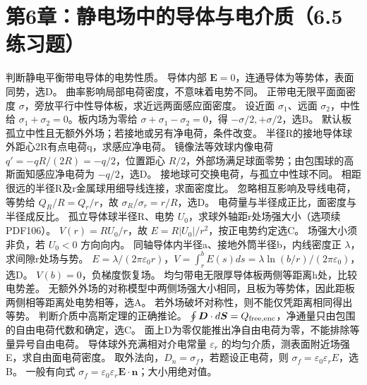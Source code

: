 \section{第6章：静电场中的导体与电介质（6.5练习题）}
\problemtext 判断静电平衡带电导体的电势性质。
\workings 导体内部 $\bm E=0$，连通导体为等势体，表面同势，选D。
\crosscheck 曲率影响局部电荷密度，不意味着电势不同。
\problemtext 正带电无限平面面密度 $\sigma$，旁放平行中性导体板，求近远两面感应面密度。
\workings 设近面 $\sigma_1$、远面 $\sigma_2$，中性给 $\sigma_1+\sigma_2=0$。板内场为零给 $\sigma+\sigma_1-\sigma_2=0$，得 $-\sigma/2,+\sigma/2$，选B。
\crosscheck 默认板孤立中性且无额外外场；若接地或另有净电荷，条件改变。
\problemtext 半径R的接地导体球外距心2R有点电荷q，求感应净电荷。
\workings 镜像法等效球内像电荷 $q'=-qR/(2R)=-q/2$，位置距心 $R/2$，外部场满足球面零势；由包围球的高斯面知感应净电荷为 $-q/2$，选D。
\crosscheck 接地球可交换电荷，与孤立中性球不同。
\problemtext 相距很远的半径R及r金属球用细导线连接，求面密度比。
\workings 忽略相互影响及导线电荷，等势给 $Q_R/R=Q_r/r$，故 $\sigma_R/\sigma_r=r/R$，选D。
\crosscheck 电荷量与半径成正比，面密度与半径成反比。
\problemtext 孤立导体球半径R、电势 $U_0$，求球外轴距r处场强大小（选项续PDF106）。
\workings $V(r)=RU_0/r$，故 $E=R|U_0|/r^2$，按正电势约定选C。
\crosscheck 场强大小须非负，若 $U_0<0$ 方向向内。
\problemtext 同轴导体内半径a、接地外筒半径b，内线密度正 $\lambda$，求间隙r处场与势。
\workings $E=\lambda/(2\pi\varepsilon_0r)$，$V=\int_r^b E(s)ds=\lambda\ln(b/r)/(2\pi\varepsilon_0)$，选D。
\crosscheck $V(b)=0$，负梯度恢复场。
\problemtext 均匀带电无限厚导体板两侧等距离h处，比较电势差。
\workings 无额外外场的对称模型中两侧场强大小相同，且板为等势体，因此距板两侧相等距离处电势相等，选A。
\crosscheck 若外场破坏对称性，则不能仅凭距离相同得出等势。
\problemtext 判断介质中高斯定理的正确推论。
\workings $\oint\bm D\cdot d\bm S=Q_{\rm free,enc}$，净通量只由包围的自由电荷代数和确定，选C。
\crosscheck 面上D为零仅能推出净自由电荷为零，不能排除等量异号自由电荷。
\problemtext 导体球外充满相对介电常量 $\varepsilon_r$ 的均匀介质，测表面附近场强E，求自由面电荷密度。
\workings 取外法向，$D_n=\sigma_f$，若题设正电荷，则 $\sigma_f=\varepsilon_0\varepsilon_r E$，选B。
\crosscheck 一般有向式 $\sigma_f=\varepsilon_0\varepsilon_r\bm E\cdot\bm n$；大小用绝对值。
